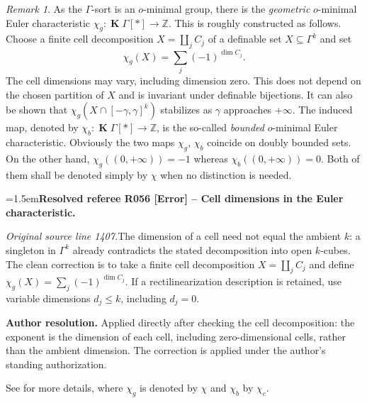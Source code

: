\documentclass[12pt]{amsart}
\newcommand{\ResolvedRefereeRemark}[5]{%
  \par\medskip\begingroup\normalfont\small\color{gray}%
  \emergencystretch=1.5em\noindent\textbf{Resolved referee R#1 [#2] -- #3.}\par\nobreak\noindent #4\par
  \medskip\color{ResolutionGreen}\noindent\textbf{Author resolution.} #5\par
  \endgroup\medskip
}
\newcommand{\memph}[1]{{\color{magenta}\emph{#1}}}
\theoremstyle{plain}
\theoremstyle{definition}
\theoremstyle{remark}
\newtheorem{rem}[thm]{Remark}
\newtheorem{nota}[thm]{Notation}
\numberwithin{equation}{section}
\theoremstyle{plain}
\newcommand{\Z}{\mathds{Z}}
\newcommand{\omin}{$o$\nobreakdash}
\newcommand{\0}{\emptyset}
\newcommand{\fun}{\longrightarrow}
\newcommand{\sub}{\subseteq}
\DeclareMathOperator{\ggk}{\mathbf{K}}
\begin{document}

\begin{rem}
As  the  $\Gamma$-sort is an \omin-minimal group, there is  the \memph{geometric} \omin-minimal Euler characteristic  $\chi_g : \ggk \Gamma[*] \fun \Z$. This is roughly constructed as follows. Choose a finite cell decomposition $X=\coprod_j C_j$ of a definable set $X\sub\Gamma^k$ and set
\[
\chi_g(X)=\sum_j(-1)^{\dim C_j}.
\]
The cell dimensions may vary, including dimension zero.
This does not depend on the chosen partition of $X$ and is invariant under definable bijections. It can also be shown that $\chi_g(X \cap [-\gamma, \gamma]^k)$ stabilizes as $\gamma$ approaches $+\infty$. The induced map, denoted by $\chi_b: \ggk \Gamma[*] \fun \Z$,  is the so-called \memph{bounded} \omin-minimal Euler characteristic. Obviously the two maps $\chi_g$, $\chi_b$  coincide on doubly bounded sets. On the other hand,  $\chi_g((0,+\infty))=-1$ whereas $\chi_b((0,+\infty))=0$. Both of them shall be denoted simply by $\chi$ when no distinction is needed.

\ResolvedRefereeRemark{056}{Error}{Cell dimensions in the Euler characteristic}{%
\textit{Original source line 1407.}\quad The dimension of a cell need not equal the ambient $k$: a singleton in $\Gamma^k$ already contradicts the stated decomposition into open $k$-cubes. The clean correction is to take a finite cell decomposition $X=\coprod_j C_j$ and define $\chi_g(X)=\sum_j(-1)^{\dim C_j}$. If a rectilinearization description is retained, use variable dimensions $d_j\leq k$, including $d_j=0$.
}{Applied directly after checking the cell decomposition: the exponent is the dimension of each cell, including zero-dimensional cells, rather than the ambient dimension. The correction is applied under the author's standing authorization.}

See \cite[\S~9]{hrushovski:kazhdan:integration:vf} for more details, where $\chi_g$ is denoted by $\chi$ and $\chi_b$ by $\chi_c$.
\end{rem}
\end{document}
